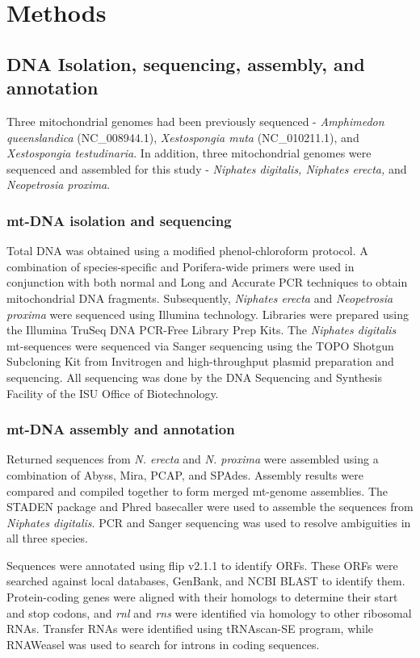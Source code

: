 \documentclass[../main.tex]{subfiles}
\begin{document}
\section{Methods}

\subsection{DNA Isolation, sequencing, assembly, and annotation}
Three mitochondrial genomes had been previously sequenced - \emph{Amphimedon queenslandica} (NC\_008944.1), \emph{Xestospongia muta} (NC\_010211.1), and \emph{Xestospongia testudinaria}. In addition, three mitochondrial genomes were sequenced and assembled for this study - \emph{Niphates digitalis, Niphates erecta,} and \emph{Neopetrosia proxima}.

\subsubsection{mt-DNA isolation and sequencing}
Total DNA was obtained using a modified phenol-chloroform protocol. A combination of species-specific and Porifera-wide primers were used in conjunction with both normal and Long and Accurate PCR techniques to obtain mitochondrial DNA fragments.
Subsequently, \emph{Niphates erecta} and \emph{Neopetrosia proxima} were sequenced using Illumina technology. Libraries were prepared using the Illumina TruSeq DNA PCR-Free Library Prep Kits. The \emph{Niphates digitalis} mt-sequences were sequenced via Sanger sequencing using the TOPO Shotgun Subcloning Kit from Invitrogen and high-throughput plasmid preparation and sequencing. All sequencing was done by the DNA Sequencing and Synthesis Facility of the ISU Office of Biotechnology.

\subsubsection{mt-DNA assembly and annotation}

Returned sequences from \emph{N. erecta} and \emph{N. proxima} were assembled using a combination of Abyss, Mira, PCAP, and SPAdes. Assembly results were compared and compiled together to form merged mt-genome assemblies. The STADEN package and Phred basecaller were used to assemble the sequences from \emph{Niphates digitalis}. PCR and Sanger sequencing was used to resolve ambiguities in all three species. 

Sequences were annotated using flip v2.1.1 to identify ORFs. These ORFs were searched against local databases, GenBank, and NCBI BLAST to identify them. Protein-coding genes were aligned with their homologs to determine their start and stop codons, and \emph{rnl} and \emph{rns} were identified via homology to other ribosomal RNAs. Transfer RNAs were identified using tRNAscan-SE program, while RNAWeasel was used to search for introns in coding sequences.
\end{document}
